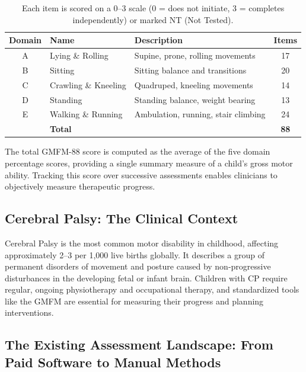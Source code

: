 \documentclass[11pt,a4paper]{article}
\begin{document}
\begin{table}[H]
\centering
\renewcommand{\arraystretch}{1.3}
\begin{tabularx}{0.85\textwidth}{c l X c}
\toprule
\textbf{Domain} & \textbf{Name} & \textbf{Description} & \textbf{Items} \\
\midrule
A & Lying \& Rolling    & Supine, prone, rolling movements              & 17 \\
B & Sitting             & Sitting balance and transitions                & 20 \\
C & Crawling \& Kneeling & Quadruped, kneeling movements                 & 14 \\
D & Standing            & Standing balance, weight bearing               & 13 \\
E & Walking \& Running   & Ambulation, running, stair climbing           & 24 \\
\midrule
  & \textbf{Total}      &                                                & \textbf{88} \\
\bottomrule
\end{tabularx}
\caption*{\small Each item is scored on a 0--3 scale (0 = does not initiate, 3 = completes independently) or marked NT (Not Tested).}
\end{table}

The total GMFM-88 score is computed as the average of the five domain percentage scores, providing a single summary measure of a child's gross motor ability. Tracking this score over successive assessments enables clinicians to objectively measure therapeutic progress.

\subsection{Cerebral Palsy: The Clinical Context}

Cerebral Palsy is the most common motor disability in childhood, affecting approximately 2--3 per 1,000 live births globally. It describes a group of permanent disorders of movement and posture caused by non-progressive disturbances in the developing fetal or infant brain. Children with CP require regular, ongoing physiotherapy and occupational therapy, and standardized tools like the GMFM are essential for measuring their progress and planning interventions.

\subsection{The Existing Assessment Landscape: From Paid Software to Manual Methods}
\end{document}
